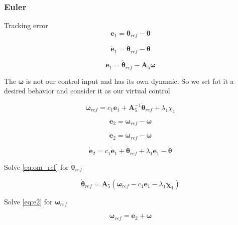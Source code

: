 \subsubsection{Euler}

Tracking error
\[
\mathbf{e}_1 = \boldsymbol\theta_{ref} - \boldsymbol\theta
\]

\[
\dot{\mathbf{e}}_1 = \dot{\boldsymbol\theta}_{ref} - \dot{\boldsymbol\theta}
\]

\begin{equation}
\dot{\mathbf{e}}_1 = \dot{\boldsymbol\theta}_{ref} - \mathbf{A}_5 \boldsymbol\omega
\label{eq:e1_dyn}
\end{equation}

The $\boldsymbol\omega$ is not our control input and has its own dynamic.
So we set fot it a desired behavior and consider it as our virtual control

\begin{equation}
\boldsymbol\omega_{ref} = c_1 \mathbf{e}_1 + \mathbf{A}_5^{-1} \dot{\boldsymbol\theta}_{ref} + \lambda_1 \chi_1
\label{eq:om_ref}
\end{equation}

\begin{equation}
\mathbf{e}_2 = \boldsymbol\omega_{ref} - \boldsymbol\omega
\label{eq:e2}
\end{equation}

\[
\dot{\mathbf{e}}_2 = \dot{\boldsymbol\omega}_{ref} - \dot{\boldsymbol\omega}
\]

\begin{equation}
\dot{\mathbf{e}}_2 = c_1 \dot{\mathbf{e}}_1 + \ddot{\boldsymbol\theta}_{ref} + \lambda_1 \mathbf{e}_1 - \ddot{\boldsymbol\theta}
\label{eq:e2_dyn}
\end{equation}



Solve \eqref{eq:om_ref} for $\dot{\boldsymbol\theta}_{ref}$

\begin{equation}
\dot{\boldsymbol\theta}_{ref} = \mathbf{A}_5 \left( \boldsymbol\omega_{ref} - c_1 \mathbf{e}_1 - \lambda_1 \boldsymbol\chi_1 \right)
\label{eq:om_ref_2}
\end{equation}

Solve \eqref{eq:e2} for $\boldsymbol\omega_{ref}$

\begin{equation}
\boldsymbol\omega_{ref} = \mathbf{e}_2 + \boldsymbol\omega
\label{eq:e2_2}
\end{equation}

